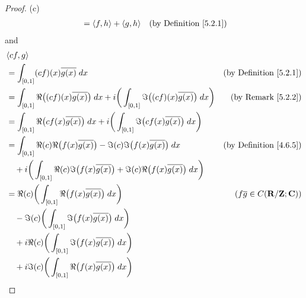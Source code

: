 \begin{proof}{(c)}
\begin{align*}
         & = \inner*{f, h} + \inner*{g, h}                                                                                                     & \text{(by Definition \ref{5.2.1})}
    \end{align*}
    and
    \begin{align*}
         & \inner*{cf, g}                                                                                                                                                                      \\
         & = \int_{[0, 1]} (cf)(x) \overline{g(x)} \; dx                                                                                                & \text{(by Definition \ref{5.2.1})}   \\
         & = \int_{[0, 1]} \Re\big((cf)(x) \overline{g(x)}\big) \; dx + i \bigg(\int_{[0, 1]} \Im\big((cf)(x) \overline{g(x)}\big) \; dx\bigg)          & \text{(by Remark \ref{5.2.2})}       \\
         & = \int_{[0, 1]} \Re\big(cf(x) \overline{g(x)}\big) \; dx + i \bigg(\int_{[0, 1]} \Im\big(cf(x) \overline{g(x)}\big) \; dx\bigg)                                                     \\
         & = \int_{[0, 1]} \Re(c) \Re\big(f(x) \overline{g(x)}\big) - \Im(c) \Im\big(f(x) \overline{g(x)}\big) \; dx                                    & \text{(by Definition \ref{4.6.5})}   \\
         & \quad + i \bigg(\int_{[0, 1]} \Re(c) \Im\big(f(x) \overline{g(x)}\big) + \Im(c) \Re\big(f(x) \overline{g(x)}\big) \; dx\bigg)                                                       \\
         & = \Re(c) \bigg(\int_{[0, 1]} \Re\big(f(x) \overline{g(x)}\big) \; dx\bigg)                                                                   & (f \overline{g} \in C(\R / \Z ; \C)) \\
         & \quad - \Im(c) \bigg(\int_{[0, 1]} \Im\big(f(x) \overline{g(x)}\big) \; dx\bigg)                                                                                                    \\
         & \quad + i \Re(c) \bigg(\int_{[0, 1]} \Im\big(f(x) \overline{g(x)}\big) \; dx\bigg)                                                                                                  \\
         & \quad + i \Im(c) \bigg(\int_{[0, 1]} \Re\big(f(x) \overline{g(x)}\big) \; dx\bigg)                                                                                                  \\

\end{align*}
\end{proof}
